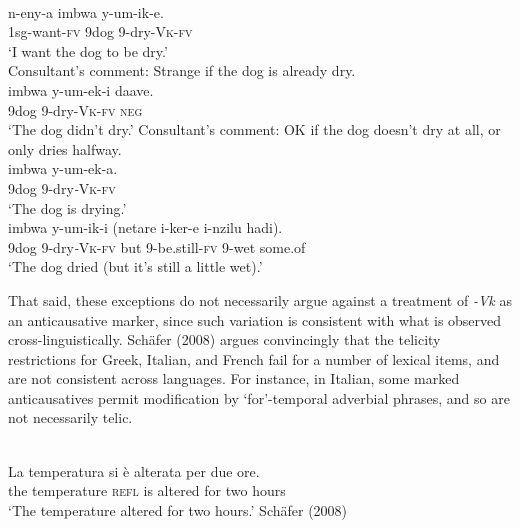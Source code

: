 \documentclass[output=paper]{langsci/langscibook}
\begin{document}
\ea\label{exx:}
\ea
{}\\
\gll n-eny-a          imbwa y-um-ik-e.\\
     1sg-want-\textsc{fv} 9dog    9-dry-\textsc{Vk}-\textsc{fv}\\
\glt ‘I want the dog to be dry.’\\
\glt Consultant’s comment: Strange if the dog is already dry.
\ex
{}\\
\gll imbwa y-um-ek-i     daave.\\
     9dog    9-dry-\textsc{Vk}-\textsc{fv} \textsc{neg}\\
\glt ‘The dog didn’t dry.’
\glt Consultant’s comment: OK if the dog doesn’t dry at all, or only dries halfway.
\ex
{}\\
\gll imbwa y-um-ek-a.\\
     9dog   9-dry\textit{-}\textsc{Vk}-\textsc{fv}\\
\glt ‘The dog is drying.’
\\
\gll imbwa y-um-ik-i      (netare i-ker-e         i-nzilu hadi).\\
     9dog   9-dry\textit{-}\textsc{Vk}-\textsc{fv} but       9-be.still-\textsc{fv} 9-wet some.of\\
\glt ‘The dog dried (but it’s still a little wet).’
\z
\z

That said, these exceptions do not necessarily argue against a treatment of \textit{-Vk} as an anticausative marker, since such variation is consistent with what is observed cross-linguistically. Schäfer (2008) argues convincingly that the telicity restrictions for Greek, Italian, and French fail for a number of lexical items, and are not consistent across languages. For instance, in Italian, some marked anticausatives permit modification by ‘for’-temporal adverbial phrases, and so are not necessarily telic.

\ea\label{exx:}
{}\\
\gll La temperatura  si     è   alterata per  due ore.\\
     the temperature \textsc{refl} is  altered  for   two hours\\
\glt ‘The temperature altered for two hours.’        Schäfer (2008)
\z
\end{document}

